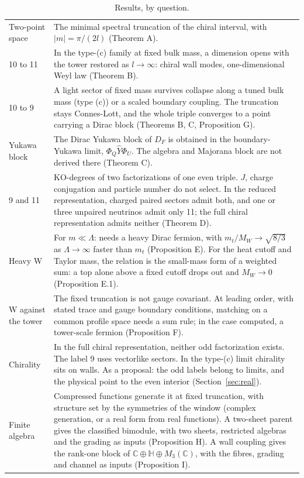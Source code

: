 \documentclass[aps,prd,reprint,onecolumn,nofootinbib,amsmath,amssymb,floatfix]{revtex4-2}
\theoremstyle{plain}
\newcommand{\C}{\mathbb C}
\renewcommand{\H}{\mathbb H}
\begin{document}
\begin{table}[t]
\ifdefined\mobile\footnotesize\fi
\caption{\label{tab:results}Results, by question.}
\begin{ruledtabular}
\begin{tabular}{p{62pt}p{170pt}}
Two-point space & The minimal spectral truncation of the chiral interval, with $|m|=\pi/(2l)$ (Theorem A).\\
10 to 11 & In the type-(c) family at fixed bulk mass, a dimension opens with the tower restored as $l\to\infty$: chiral wall modes, one-dimensional Weyl law (Theorem B).\\
10 to 9 & A light sector of fixed mass survives collapse along a tuned bulk mass (type (c)) or a scaled boundary coupling. The truncation stays Connes-Lott, and the whole triple converges to a point carrying a Dirac block (Theorems B, C, Proposition G).\\
Yukawa block & The Dirac Yukawa block of $D_F$ is obtained in the boundary-Yukawa limit, $\Phi_Q\hat Y\Phi_U$. The algebra and Majorana block are not derived there (Theorem C).\\
9 and 11 & KO-degrees of two factorizations of one even triple. $J$, charge conjugation and particle number do not select. In the reduced representation, charged paired sectors admit both, and one or three unpaired neutrinos admit only 11; the full chiral representation admits neither (Theorem D).\\
Heavy W & For $m\ll\Lambda$: needs a heavy Dirac fermion, with $m_t/M_W\to\sqrt{8/3}$ as $\Lambda\to\infty$ faster than $m_t$ (Proposition E). For the heat cutoff and Taylor mass, the relation is the small-mass form of a weighted sum: a top alone above a fixed cutoff drops out and $M_W\to0$ (Proposition E.1).\\
W against the tower & The fixed truncation is not gauge covariant. At leading order, with stated trace and gauge boundary conditions, matching on a common profile space needs a sum rule; in the case computed, a tower-scale fermion (Proposition F).\\
Chirality & In the full chiral representation, neither odd factorization exists. The label 9 uses vectorlike sectors. In the type-(c) limit chirality sits on walls. As a proposal: the odd labels belong to limits, and the physical point to the even interior (Section~\ref{sec:real}).\\
Finite algebra & Compressed functions generate it at fixed truncation, with structure set by the symmetries of the window (complex generation, or a real form from real functions). A two-sheet parent gives the classified bimodule, with two sheets, restricted algebras and the grading as inputs (Proposition H). A wall coupling gives the rank-one block of $\C\oplus\H\oplus M_3(\C)$, with the fibres, grading and channel as inputs (Proposition I).
\end{tabular}
\end{ruledtabular}
\end{table}
\end{document}
